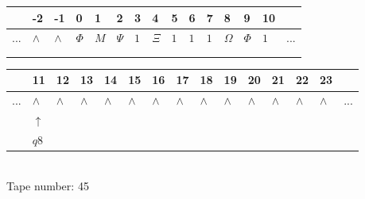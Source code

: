 \documentclass[11pt]{article}
\begin{document}
\begin{table}[H]
\centering
\begin{tabular}{lllllllllllllll}
 & -2 & -1 & 0 & 1 & 2 & 3 & 4 & 5 & 6 & 7 & 8 & 9 & 10 & \\
\hline
$...$ & \multicolumn{1}{|l|}{$\wedge$} & \multicolumn{1}{|l|}{$\wedge$} & \multicolumn{1}{|l|}{$\Phi$} & \multicolumn{1}{|l|}{$M$} & \multicolumn{1}{|l|}{$\Psi$} & \multicolumn{1}{|l|}{$1$} & \multicolumn{1}{|l|}{$\Xi$} & \multicolumn{1}{|l|}{$1$} & \multicolumn{1}{|l|}{$1$} & \multicolumn{1}{|l|}{$1$} & \multicolumn{1}{|l|}{$\Omega$} & \multicolumn{1}{|l|}{$\Phi$} & \multicolumn{1}{|l|}{$1$} & $...$\\
\hline
&  &  &  &  &  &  &  &  &  &  &  &  &  &  \\
&  &  &  &  &  &  &  &  &  &  &  &  &  &  \\
\end{tabular}
\begin{tabular}{lllllllllllllll}
 & 11 & 12 & 13 & 14 & 15 & 16 & 17 & 18 & 19 & 20 & 21 & 22 & 23 & \\
\hline
$...$ & \multicolumn{1}{|l|}{$\wedge$} & \multicolumn{1}{|l|}{$\wedge$} & \multicolumn{1}{|l|}{$\wedge$} & \multicolumn{1}{|l|}{$\wedge$} & \multicolumn{1}{|l|}{$\wedge$} & \multicolumn{1}{|l|}{$\wedge$} & \multicolumn{1}{|l|}{$\wedge$} & \multicolumn{1}{|l|}{$\wedge$} & \multicolumn{1}{|l|}{$\wedge$} & \multicolumn{1}{|l|}{$\wedge$} & \multicolumn{1}{|l|}{$\wedge$} & \multicolumn{1}{|l|}{$\wedge$} & \multicolumn{1}{|l|}{$\wedge$} & $...$\\
\hline
& $\uparrow$ &  &  &  &  &  &  &  &  &  &  &  &  &  \\
& $ q8 $ &  &  &  &  &  &  &  &  &  &  &  &  &  \\
\end{tabular}
\\
Tape number: 45
\noindent\makebox[\linewidth]{\hdashrule{\textwidth}{1pt}{1pt}}\end{table}
\end{document}
